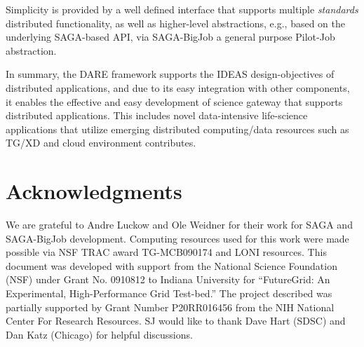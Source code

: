 \documentclass{sig-alternate}
\begin{document}
Simplicity is provided by a well defined interface that supports
multiple {\it standards} distributed functionality, as well as
higher-level abstractions, e.g., based on the underlying SAGA-based
API, via SAGA-BigJob a general purpose Pilot-Job abstraction.

In summary, the DARE framework supports the IDEAS design-objectives of
distributed applications, and due to its easy integration with other
components, it enables the effective and easy development of science
gateway that supports distributed applications. This includes novel
data-intensive life-science applications that utilize emerging
distributed computing/data resources such as TG/XD and cloud
environment contributes.


\section{Acknowledgments}
We are grateful to Andre Luckow and Ole Weidner for their work for
SAGA and SAGA-BigJob development.  Computing resources used for this
work were made possible via NSF TRAC award TG-MCB090174 and LONI
resources.  This document was developed with support from the National
Science Foundation (NSF) under Grant No.  0910812 to Indiana
University for ``FutureGrid: An Experimental, High-Performance Grid
Test-bed.'' The project described was partially supported by Grant
Number P20RR016456 from the NIH National Center For Research
Resources. SJ would like to thank Dave Hart (SDSC) and Dan Katz
(Chicago) for helpful discussions.

%

%

\end{document}
